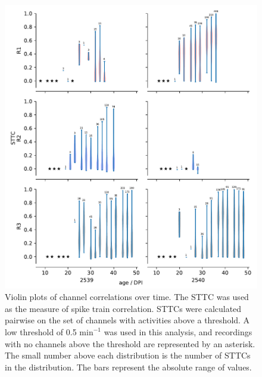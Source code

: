 \documentclass[doublespacing]{bmcart}
\begin{document}
\begin{backmatter}
\begin{figure}[h!]
    \includegraphics{../plots/correlation_plots.pdf}
	\caption{Violin plots of channel correlations over time. The STTC was used as the measure of spike train correlation. STTCs were calculated pairwise on the set of channels with activities above a threshold. A low threshold of 0.5 \(\text{min}^{-1}\) was used in this analysis, and recordings with no channels above the threshold are represented by an asterisk. The small number above each distribution is the number of STTCs in the distribution. The bars represent the absolute range of values.}
	\label{fig:correlation}
\end{figure}


\end{backmatter}
\end{document}
